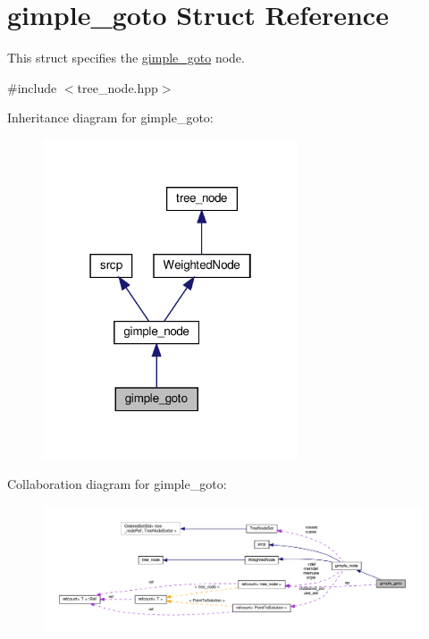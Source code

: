 \hypertarget{structgimple__goto}{}\section{gimple\+\_\+goto Struct Reference}
\label{structgimple__goto}


This struct specifies the \hyperlink{structgimple__goto}{gimple\+\_\+goto} node.  




{\ttfamily \#include $<$tree\+\_\+node.\+hpp$>$}



Inheritance diagram for gimple\+\_\+goto\+:
\nopagebreak
\begin{figure}[H]
\begin{center}
\leavevmode
\includegraphics[width=214pt]{df/d5a/structgimple__goto__inherit__graph}
\end{center}
\end{figure}


Collaboration diagram for gimple\+\_\+goto\+:
\nopagebreak
\begin{figure}[H]
\begin{center}
\leavevmode
\includegraphics[width=350pt]{d5/d0a/structgimple__goto__coll__graph}
\end{center}
\end{figure}
